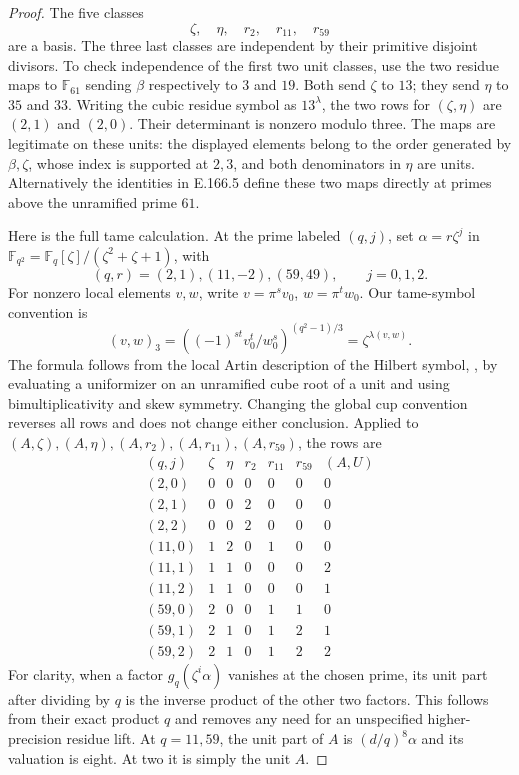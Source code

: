 \begin{proof}
The five classes
\[
                   \zeta,\quad\eta,\quad r_2,\quad r_{11},\quad r_{59}
\tag{E.166.8}
\]
are a basis.  The three last classes are independent by their
primitive disjoint divisors.  To check independence of the first
two unit classes, use the two residue maps to \(\mathbb F_{61}\) sending
\(\beta\) respectively to \(3\) and \(19\).  Both send
\(\zeta\) to \(13\); they send \(\eta\) to \(35\) and \(33\).
Writing the cubic residue symbol as \(13^{\lambda}\), the two
rows for \((\zeta,\eta)\) are \((2,1)\) and \((2,0)\).
Their determinant is nonzero modulo three.  The maps are legitimate
on these units: the displayed elements belong to the order generated
by \(\beta,\zeta\), whose index is supported at \(2,3\), and
both denominators in \(\eta\) are units.  Alternatively the
identities in E.166.5 define these two maps directly at primes
above the unramified prime \(61\).

Here is the full tame calculation.  At the prime labeled \((q,j)\),
set \(\alpha=r\zeta^j\) in
\(\mathbb F_{q^2}=\mathbb F_q[\zeta]/(\zeta^2+\zeta+1)\), with
\[
 (q,r)=(2,1),(11,-2),(59,49),\qquad j=0,1,2.
\]
For nonzero local elements \(v,w\), write
\(v=\pi^s v_0\), \(w=\pi^t w_0\).  Our tame-symbol convention is
\[
 (v,w)_3=\left((-1)^{st}v_0^t/w_0^s\right)^{(q^2-1)/3}
          =\zeta^{\lambda(v,w)}.
\tag{E.166.9}
\]
The formula follows from the local Artin description of the Hilbert
symbol, \cite[III, Theorem 4.4 and Remark 4.5, pp.~113--114]{RootMilneCFT},
by evaluating a uniformizer on an unramified cube root of a unit
and using bimultiplicativity and skew symmetry.
Changing the global cup convention reverses all rows and does not
change either conclusion.  Applied to \((A,\zeta),(A,\eta),
(A,r_2),(A,r_{11}),(A,r_{59})\), the rows are
\[
\begin{array}{c|rrrrr|r}
 (q,j)&\zeta&\eta&r_2&r_{11}&r_{59}&(A,U)\\\hline
 (2,0)&0&0&0&0&0&0\\
 (2,1)&0&0&2&0&0&0\\
 (2,2)&0&0&2&0&0&0\\
 (11,0)&1&2&0&1&0&0\\
 (11,1)&1&1&0&0&0&2\\
 (11,2)&1&1&0&0&0&1\\
 (59,0)&2&0&0&1&1&0\\
 (59,1)&2&1&0&1&2&1\\
 (59,2)&2&1&0&1&2&2
\end{array}
\tag{E.166.10}
\]
For clarity, when a factor \(g_q(\zeta^i\alpha)\) vanishes at
the chosen prime, its unit part after dividing by \(q\) is the
inverse product of the other two factors.  This follows from their
exact product \(q\) and removes any need for an unspecified
higher-precision residue lift.  At \(q=11,59\), the unit part
of \(A\) is \((d/q)^8\alpha\) and its valuation is eight.
At two it is simply the unit \(A\).


\end{proof}
